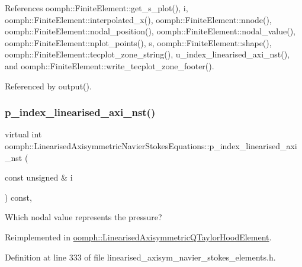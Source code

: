 References oomph\+::\+Finite\+Element\+::get\+\_\+s\+\_\+plot(), i, oomph\+::\+Finite\+Element\+::interpolated\+\_\+x(), oomph\+::\+Finite\+Element\+::nnode(), oomph\+::\+Finite\+Element\+::nodal\+\_\+position(), oomph\+::\+Finite\+Element\+::nodal\+\_\+value(), oomph\+::\+Finite\+Element\+::nplot\+\_\+points(), s, oomph\+::\+Finite\+Element\+::shape(), oomph\+::\+Finite\+Element\+::tecplot\+\_\+zone\+\_\+string(), u\+\_\+index\+\_\+linearised\+\_\+axi\+\_\+nst(), and oomph\+::\+Finite\+Element\+::write\+\_\+tecplot\+\_\+zone\+\_\+footer().



Referenced by output().

\mbox{\label{classoomph_1_1LinearisedAxisymmetricNavierStokesEquations_af4828bf6fb5dbd8ff92e159676460d49}} 
\subsubsection{\texorpdfstring{p\+\_\+index\+\_\+linearised\+\_\+axi\+\_\+nst()}{p\_index\_linearised\_axi\_nst()}}
{\footnotesize\ttfamily virtual int oomph\+::\+Linearised\+Axisymmetric\+Navier\+Stokes\+Equations\+::p\+\_\+index\+\_\+linearised\+\_\+axi\+\_\+nst (\begin{DoxyParamCaption}\item[{const unsigned \&}]{i }\end{DoxyParamCaption}) const\hspace{0.3cm}{\ttfamily [inline]}, {\ttfamily [virtual]}}



Which nodal value represents the pressure? 



Reimplemented in \hyperlink{classoomph_1_1LinearisedAxisymmetricQTaylorHoodElement_aba8d88861814753c5aeeb26f0985c3d9}{oomph\+::\+Linearised\+Axisymmetric\+Q\+Taylor\+Hood\+Element}.



Definition at line 333 of file linearised\+\_\+axisym\+\_\+navier\+\_\+stokes\+\_\+elements.\+h.



